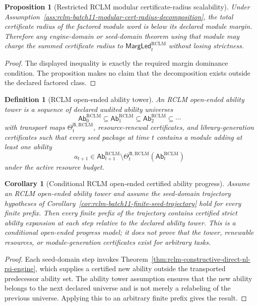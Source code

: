 \documentclass[11pt,a4paper]{article}
\newtheorem{proposition}[theorem]{Proposition}
\newtheorem{corollary}[theorem]{Corollary}
\newtheorem{definition}[theorem]{Definition}
\newcommand{\RCLM}{\mathrm{RCLM}}
\begin{document}
\begin{proposition}[Restricted RCLM modular certificate-radius scalability]
\label{prop:rclm-batch11-modular-cert-radius-scalability}
Under Assumption~\ref{ass:rclm-batch11-modular-cert-radius-decomposition}, the total certificate radius of the factored module word is below its declared module margin.  Therefore any engine-domain or seed-domain theorem using that module may charge the summed certificate radius to \(\mathsf{MargLed}_t^{\RCLM}\) without losing strictness.
\end{proposition}

\begin{proof}
The displayed inequality is exactly the required margin dominance condition.  The proposition makes no claim that the decomposition exists outside the declared factored class.
\end{proof}

\begin{definition}[RCLM open-ended ability tower]
\label{def:rclm-batch11-open-ended-ability-tower}
An RCLM open-ended ability tower is a sequence of declared audited ability universes
\[
\mathsf{Ab}_0^{\RCLM}\subseteq\mathsf{Ab}_1^{\RCLM}\subseteq\mathsf{Ab}_2^{\RCLM}\subseteq\cdots
\]
with transport maps \(\Theta_t^{\mathfrak A,\RCLM}\), resource-renewal certificates, and library-generation certificates such that every seed package at time \(t\) contains a module adding at least one ability
\[
a_{t+1}\in
\mathsf{Ab}_{t+1}^{\RCLM}
\setminus
\Theta_t^{\mathfrak A,\RCLM}(\mathsf{Ab}_t^{\RCLM})
\]
under the active resource budget.
\end{definition}

\begin{corollary}[Conditional RCLM open-ended certified ability progress]
\label{cor:rclm-batch11-open-ended-ability-progress}
Assume an RCLM open-ended ability tower and assume the seed-domain trajectory hypotheses of Corollary~\ref{cor:rclm-batch11-finite-seed-trajectory} hold for every finite prefix.  Then every finite prefix of the trajectory contains certified strict ability expansion at each step relative to the declared ability tower.  This is a conditional open-ended progress model; it does not prove that the tower, renewable resources, or module-generation certificates exist for arbitrary tasks.
\end{corollary}

\begin{proof}
Each seed-domain step invokes Theorem~\ref{thm:rclm-constructive-direct-nl-rsi-engine}, which supplies a certified new ability outside the transported predecessor ability set.  The ability tower assumption ensures that the new ability belongs to the next declared universe and is not merely a relabeling of the previous universe.  Applying this to an arbitrary finite prefix gives the result.
\end{proof}
\end{document}
